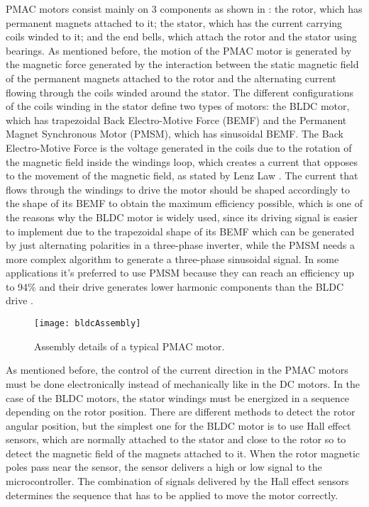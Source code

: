 PMAC motors consist mainly on 3 components as shown in : the rotor, which has permanent magnets attached to it; the stator, which has the current carrying coils winded to it; and the end bells, which attach the rotor and the stator using bearings. As mentioned before, the motion of the PMAC motor is generated by the magnetic force generated by the interaction between the static magnetic field of the permanent magnets attached to the rotor and the alternating current flowing through the coils winded around the stator. The different configurations of the coils winding in the stator define two types of motors: the BLDC motor, which has trapezoidal Back Electro-Motive Force (BEMF) and the Permanent Magnet Synchronous Motor (PMSM), which has sinusoidal BEMF. The Back Electro-Motive Force is the voltage generated in the coils due to the rotation of the magnetic field inside the windings loop, which creates a current that opposes to the movement of the magnetic field, as stated by Lenz Law \cite{MaxwellEqs}. The current that flows through the windings to drive the motor should be shaped accordingly to the shape of its BEMF to obtain the maximum efficiency possible, which is one of the reasons why the BLDC motor is widely used, since its driving signal is easier to implement due to the trapezoidal shape of its BEMF which can be generated by just alternating polarities in a three-phase inverter, while the PMSM needs a more complex algorithm to generate a three-phase sinusoidal signal. In some applications it's preferred to use PMSM because they can reach an efficiency up to 94\% and their drive generates lower harmonic components than the BLDC drive \cite{GuoPMSMefficiency2016}.\\ 

\begin{figure} [H]
\centering\texttt{[image: bldcAssembly]}
\caption{Assembly details of a typical PMAC motor.}
\label{fig:PMAC_assembly}
\end{figure}

As mentioned before, the control of the current direction in the PMAC motors must be done electronically instead of mechanically like in the DC motors. In the case of the BLDC motors, the stator windings must be energized in a sequence depending on the rotor position. There are different methods to detect the rotor angular position, but the simplest one for the BLDC motor is to use Hall effect sensors, which are normally attached to the stator and close to the rotor so to detect the magnetic field of the magnets attached to it. When the rotor magnetic poles pass near the sensor, the sensor delivers a high or low signal to the microcontroller. The combination of signals delivered by the Hall effect sensors determines the sequence that has to be applied to move the motor correctly.

